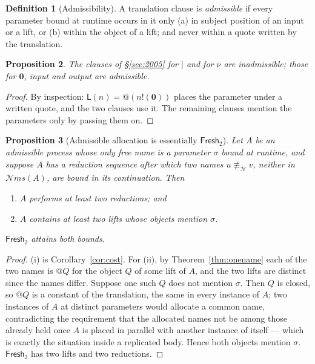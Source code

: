 \documentclass[11pt]{article}
\makeatletter
\theoremstyle{definition}
\newtheorem{definition}{Definition}[section]
\theoremstyle{plain}
\newtheorem{proposition}[definition]{Proposition}
\theoremstyle{remark}
\newcommand{\quo}[1]{@#1}
\newcommand{\out}[2]{#1!(#2)}
\newcommand{\nequiv}{\equiv_{\mathcal{N}}}
\newcommand{\nil}{\mathbf{0}}
\newcommand{\Lft}{\mathsf{L}}
\newcommand{\Frsh}{\mathsf{Fresh}_2}
\newcommand{\nms}{\mathcal{N}\!\mathit{ms}}
\makeatother
\begin{document}
\begin{definition}[Admissibility]\label{def:discipline}
A translation clause is \emph{admissible} if every parameter bound at
runtime occurs in it only (a) in subject position of an input or a lift,
or (b) within the object of a lift; and never within a quote written by
the translation.
\end{definition}

\begin{proposition}
The clauses of \S\ref{sec:2005} for $\mid$ and for $\nu$ are
inadmissible; those for $\nil$, input and output are admissible.
\end{proposition}

\begin{proof}
By inspection: $\Lft(n) = \quo{(\out{n}{\nil})}$ places the parameter
under a written quote, and the two clauses use it. The remaining clauses
mention the parameters only by passing them on.
\end{proof}

\begin{proposition}[Admissible allocation is essentially $\Frsh$]
\label{prop:forced}
Let $A$ be an admissible process whose only free name is a parameter
$\sigma$ bound at runtime, and suppose $A$ has a reduction sequence after
which two names $u \not\nequiv v$, neither in $\nms(A)$, are bound in its
continuation. Then
\begin{enumerate}[label=(\roman*),leftmargin=2.2em,nosep]
\item $A$ performs at least two reductions; and
\item $A$ contains at least two lifts whose objects mention $\sigma$.
\end{enumerate}
$\Frsh$ attains both bounds.
\end{proposition}

\begin{proof}
(i) is Corollary~\ref{cor:cost}. For (ii), by
Theorem~\ref{thm:onename} each of the two names is $\quo{Q}$ for the
object $Q$ of some lift of $A$, and the two lifts are distinct since the
names differ. Suppose one such $Q$ does not mention $\sigma$. Then $Q$ is
closed, so $\quo{Q}$ is a constant of the translation, the same in every
instance of $A$; two instances of $A$ at distinct parameters would
allocate a common name, contradicting the requirement that the allocated
names not be among those already held once $A$ is placed in parallel with
another instance of itself --- which is exactly the situation inside a
replicated body. Hence both objects mention $\sigma$. $\Frsh$ has two
lifts and two reductions.
\end{proof}
\end{document}
